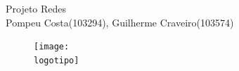 \documentclass{report}
\begin{document}
%
\def\titulo{Projeto Redes}
\def\data{Dezembro 2021}
\def\autores{Pompeu Costa(103294), Guilherme Craveiro(103574)}
\def\logotipo{ua.pdf}
%
\begin{titlepage}

\begin{center}
%
\vspace*{50mm}
%
{\Huge \titulo}\\ 
%
\vspace{10mm}
%
%
\vspace{10mm}
%
{\LARGE \autores}\\ 
%
\vspace{30mm}
%
\begin{figure}[h]
\center
\texttt{[image: \\logotipo]}
\end{figure}
%
\vspace{30mm}
\end{center}
\end{titlepage}

\clearpage
{}
\end{document}
